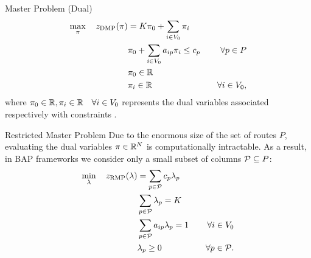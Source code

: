 \begin{frame}{Master Problem (Dual)}
	\begin{align}
		\max_{\pi} \quad z_{\mathrm{DMP}}(\pi) & =  K \pi_0 + \sum_{i \in V_0} \pi_i           & \label{eq:dmp-obj-func}                             \\
		                                 & \pi_0 + \sum_{i \in V_0} a_{ip} \pi_i \le c_p & \quad \forall p \in P \label{eq:dmp-constraint1}    \\
		                                 & \pi_0 \in \mathbb R                                  & \label{eq:dmp-constraint2}                          \\
		                                 & \pi_i \in \mathbb R                                  & \quad \forall i \in V_0 \label{eq:dmp-constraint3},
	\end{align}
	where $\pi_0 \in \mathbb R, \pi_i \in \mathbb R \quad \forall i \in V_0$ represents the dual variables
	associated respectively with constraints .
\end{frame}

\begin{frame}{Restricted Master Problem}
	Due to the enormous size of the set of routes $P$, evaluating the dual variables $\pi \in \mathbb R^{N}$ is computationally intractable.
	As a result, in BAP frameworks we consider only a small subset of columns $\mathcal{P} \subseteq P$:
	\begin{align}
		\min_{\lambda} \quad z_{\mathrm{RMP}}(\lambda) & = \sum_{p \in \mathcal{P}}  c_p \lambda_p      & \label{eq:rmp-obj-func}                                                                                                    \\
		                                         & \sum_{p \in \mathcal{P}} \lambda_{p} = K       & \label{eq:rmp-K-routes}                                                                                                    \\
		                                         & \sum_{p \in \mathcal{P}}  a_{ip} \lambda_p = 1 & \quad \forall i \in V_0                                              \label{eq:rmp-customers-visited-by-exactly-one-route} \\
		                                         & \lambda_p \ge 0                         & \quad \forall p \in \mathcal{P} \label{eq:rmp-lambda-mip-var-bounds}.
	\end{align}
\end{frame}

